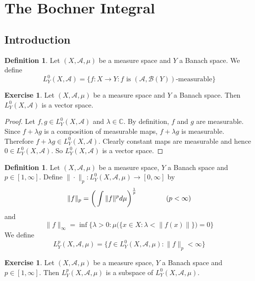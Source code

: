 \documentclass[12pt]{amsart}
\theoremstyle{definition}
\newtheorem{defn}[definition]{Definition}
\newtheorem{ex}[definition]{Exercise}
\newcommand{\lam}{\lambda}
\newcommand{\C}{\mathbb{C}}
\newcommand{\MA}{\mathcal{A}}
\newcommand{\MB}{\mathcal{B}}
\newcommand{\lex}[1]{\label{ex:#1}}
\newcommand{\ld}[1]{\label{defn:#1}}
\begin{document}
	
	\newpage
	\section{The Bochner Integral}
	
	\subsection{Introduction}
	
	\begin{defn} \ld{00000} 	
	Let $(X, \MA, \mu)$ be a measure space and $Y$ a Banach space. We define $$L_Y^0(X, \MA) = \bigg \{ f:X \rightarrow Y: f \text{ is } (\MA, \MB(Y)) \text{-measurable}\bigg \}$$ 
	\end{defn}
	
	\begin{ex} \lex{00000} 
	Let $(X, \MA, \mu)$ be a measure space and $Y$ a Banach space. Then $L_Y^0(X, \MA)$ is a vector space.
	\end{ex}
	
	\begin{proof}
	Let $f, g \in L_Y^0(X, \MA)$ and $\lam \in \C$. By definition, $f$ and $g$ are measurable. Since $f+\lam g $ is a composition of measurable maps, $f + \lam g$ is measurable. Therefore $f + \lam g \in L_Y^0(X, \MA)$. Clearly constant maps are measurable and hence $0 \in L_Y^0(X, \MA)$. So $L_Y^0(X, \MA)$ is a vector space. 
	\end{proof}
	
	\begin{defn} \ld{00000} 
		Let $(X, \MA, \mu)$ be a measure space, $Y$ a Banach space and $p \in [1, \infty]$. Define $  \| \cdot \|_p : L_Y^0(X, \MA, \mu) \rightarrow [0, \infty]$ by $$\|f \|_p = \bigg(\int  \|f\|^p d\mu \bigg)^{\frac{1}{p}} \hspace{1.5cm}( p < \infty)$$ 
		and 
		$$\|f \|_{\infty} = \inf \bigg \{\lam >0: \mu\big(\{x \in X: \lam < \|f(x)\|  \}\big) = 0 \bigg \} $$
		We define $$L_Y^p(X, \MA, \mu) =  \{f \in L_Y^0(X, \MA, \mu): \|f \|_p < \infty \}$$
	\end{defn}	
	
	\begin{ex} \lex{00000} 
	Let $(X, \MA, \mu)$ be a measure space, $Y$ a Banach space and $p \in [1, \infty]$. Then $L_Y^p(X, \MA, \mu)$ is a subspace of $L_Y^0(X, \MA, \mu)$. 
	\end{ex}
	
\end{document}
